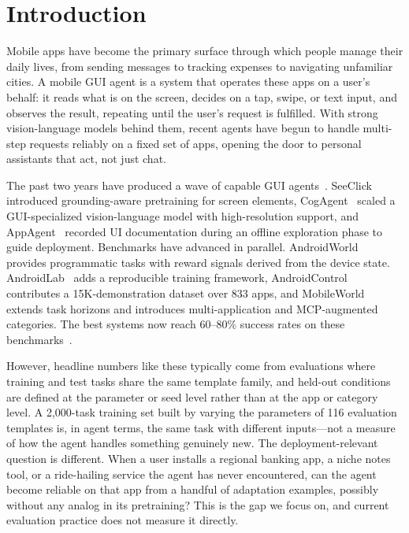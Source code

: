 \section{Introduction}
\label{sec:intro}

Mobile apps have become the primary surface through which people manage their daily lives, from sending messages to tracking expenses to navigating unfamiliar cities. A mobile GUI agent is a system that operates these apps on a user's behalf: it reads what is on the screen, decides on a tap, swipe, or text input, and observes the result, repeating until the user's request is fulfilled. With strong vision-language models behind them, recent agents have begun to handle multi-step requests reliably on a fixed set of apps, opening the door to personal assistants that act, not just chat.

The past two years have produced a wave of capable GUI agents~\citep{cheng2024seeclick,hong2024cogagent,yang2023appagent,guo2025agentsama}. SeeClick~\citep{cheng2024seeclick} introduced grounding-aware pretraining for screen elements, CogAgent~\citep{hong2024cogagent} scaled a GUI-specialized vision-language model with high-resolution support, and AppAgent~\citep{yang2023appagent} recorded UI documentation during an offline exploration phase to guide deployment. Benchmarks have advanced in parallel. AndroidWorld~\citep{rawles2024androidworld} provides programmatic tasks with reward signals derived from the device state. AndroidLab~\citep{xu2024androidlab} adds a reproducible training framework, AndroidControl~\citep{li2024androidcontrol} contributes a 15K-demonstration dataset over 833 apps, and MobileWorld~\citep{mobileworld2025} extends task horizons and introduces multi-application and MCP-augmented categories. The best systems now reach 60--80\% success rates on these benchmarks~\citep{openmobile2026,mobilerl2025}.

However, headline numbers like these typically come from evaluations where training and test tasks share the same template family, and held-out conditions are defined at the parameter or seed level rather than at the app or category level. A 2,000-task training set built by varying the parameters of 116 evaluation templates is, in agent terms, the same task with different inputs---not a measure of how the agent handles something genuinely new. The deployment-relevant question is different. When a user installs a regional banking app, a niche notes tool, or a ride-hailing service the agent has never encountered, can the agent become reliable on that app from a handful of adaptation examples, possibly without any analog in its pretraining? This is the gap we focus on, and current evaluation practice does not measure it directly.

